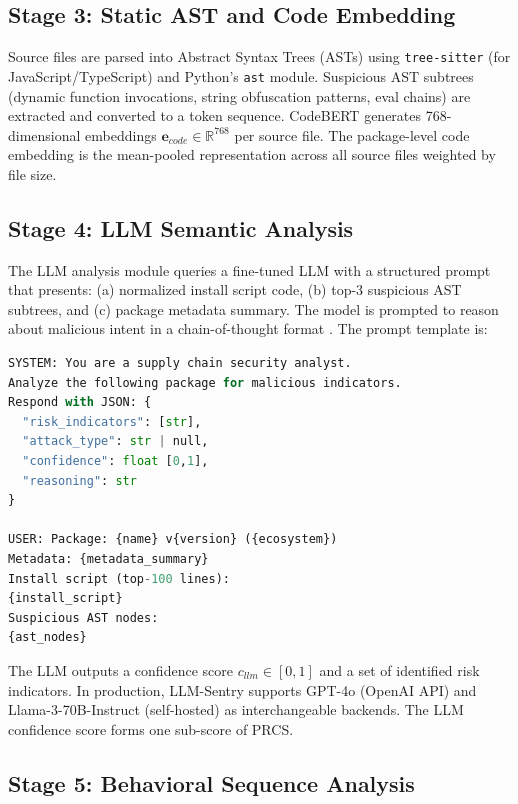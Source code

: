 \documentclass[conference]{IEEEtran}
\begin{document}
\subsection{Stage 3: Static AST and Code Embedding}

Source files are parsed into Abstract Syntax Trees (ASTs) using \texttt{tree-sitter} (for JavaScript/TypeScript) and Python's \texttt{ast} module. Suspicious AST subtrees (dynamic function invocations, string obfuscation patterns, eval chains) are extracted and converted to a token sequence. CodeBERT \cite{multitaskllm2024tse} generates 768-dimensional embeddings $\mathbf{e}_{code} \in \mathbb{R}^{768}$ per source file. The package-level code embedding is the mean-pooled representation across all source files weighted by file size.

\subsection{Stage 4: LLM Semantic Analysis}

The LLM analysis module queries a fine-tuned LLM with a structured prompt that presents: (a) normalized install script code, (b) top-3 suspicious AST subtrees, and (c) package metadata summary. The model is prompted to reason about malicious intent in a chain-of-thought format \cite{llmvulndetect2024icse}. The prompt template is:

\begin{lstlisting}[language=Python, caption={LLM-Sentry Prompt Template}, label={lst:prompt}]
SYSTEM: You are a supply chain security analyst.
Analyze the following package for malicious indicators.
Respond with JSON: {
  "risk_indicators": [str],
  "attack_type": str | null,
  "confidence": float [0,1],
  "reasoning": str
}

USER: Package: {name} v{version} ({ecosystem})
Metadata: {metadata_summary}
Install script (top-100 lines):
{install_script}
Suspicious AST nodes:
{ast_nodes}
\end{lstlisting}

The LLM outputs a confidence score $c_{llm} \in [0,1]$ and a set of identified risk indicators. In production, LLM-Sentry supports GPT-4o (OpenAI API) and Llama-3-70B-Instruct (self-hosted) as interchangeable backends. The LLM confidence score forms one sub-score of PRCS.

\subsection{Stage 5: Behavioral Sequence Analysis}
\end{document}
